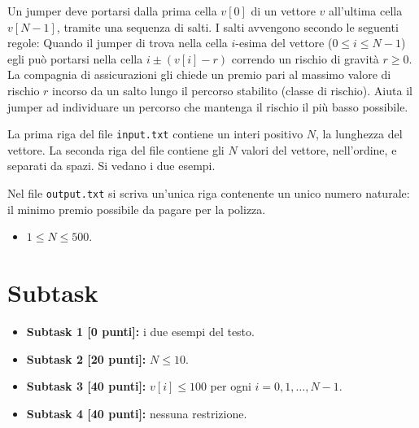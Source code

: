 \renewcommand{\nomebreve}{bungeejumping}
\renewcommand{\titolo}{Jump Jump}

\introduzione{}

Un jumper deve portarsi dalla prima cella $v[0]$ di un vettore $v$ all'ultima cella $v[N-1]$, tramite una sequenza di salti.
I salti avvengono secondo le seguenti regole:
Quando il jumper di trova nella cella $i$-esima del vettore ($0\leq i \leq N-1$)
egli può portarsi nella cella $i\pm (v[i] - r)$ correndo un rischio di gravità $r\geq 0$. La compagnia di assicurazioni gli chiede un premio pari al massimo valore di rischio $r$ incorso da un salto lungo il percorso stabilito (classe di rischio).
Aiuta il jumper ad individuare un percorso che mantenga il rischio il più basso possibile.




La prima riga del file \verb'input.txt' contiene un interi positivo $N$, la lunghezza del vettore.
La seconda riga del file contiene gli $N$ valori del vettore, nell'ordine, e separati da spazi.
Si vedano i due esempi.

Nel file \verb'output.txt' si scriva un'unica riga contenente
un unico numero naturale: il minimo premio possibile da pagare per la polizza.\\





\begin{itemize}[nolistsep, noitemsep]
  \item $1 \le N \le 500$.
\end{itemize}
  
  \section*{Subtask}
  \begin{itemize}
    \item \textbf{Subtask 1 [0 punti]:} i due esempi del testo.
    \item \textbf{Subtask 2 [20 punti]:} $N \leq 10$.
    \item \textbf{Subtask 3 [40 punti]:} $v[i] \leq 100$ per ogni $i = 0,1,\ldots, N-1$.
    \item \textbf{Subtask 4 [40 punti]:} nessuna restrizione.
  \end{itemize}
  
